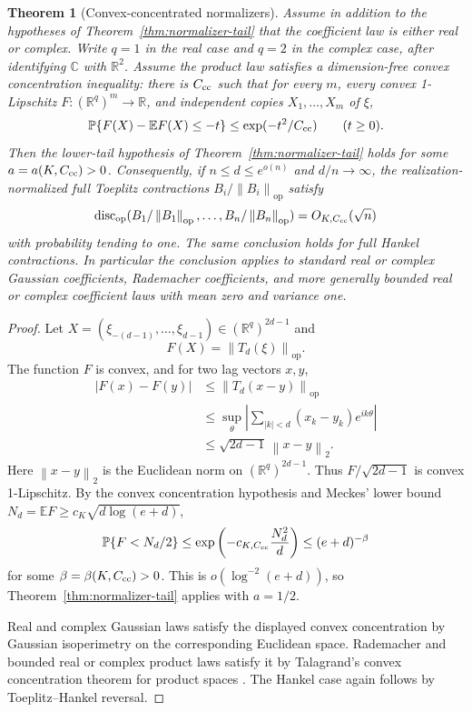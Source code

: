 \documentclass[11pt]{amsart}
\numberwithin{equation}{section}
\newtheorem{theorem}{Theorem}[section]
\theoremstyle{definition}
\theoremstyle{remark}
\newcommand{\C}{\mathbb C}
\newcommand{\R}{\mathbb R}
\newcommand{\op}{\mathrm{op}}
\newcommand{\discop}{\operatorname{disc}_{\op}}
\newcommand{\Prob}{\mathbb P}
\newcommand{\Exp}{\mathbb E}
\newcommand{\norm}[1]{\left\lVert #1\right\rVert}
\newcommand{\abs}[1]{\left\lvert #1\right\rvert}
\begin{document}
\begin{theorem}[Convex-concentrated normalizers]
\label{thm:convex-normalizers}
Assume in addition to the hypotheses of Theorem~\ref{thm:normalizer-tail} that
the coefficient law is either real or complex.  Write \(q=1\) in the real case
and \(q=2\) in the complex case, after identifying \(\C\) with \(\R^2\).
Assume the product law satisfies a dimension-free convex concentration
inequality: there is \(C_{\rm cc}\) such that for every \(m\), every convex
1-Lipschitz \(F:(\R^q)^m\to\R\), and independent copies
\(X_1,\ldots,X_m\) of \(\xi\),
\[
  \Prob\{F(X)-\Exp F(X)\le -t\}\le \exp(-t^2/C_{\rm cc})
  \qquad (t\ge0).
\]
Then the lower-tail hypothesis of Theorem~\ref{thm:normalizer-tail} holds for
some \(a=a(K,C_{\rm cc})>0\).  Consequently, if
\(n\le d\le e^{o(n)}\) and \(d/n\to\infty\), the realization-normalized full
Toeplitz contractions \(B_i/\norm{B_i}_{\op}\) satisfy
\[
  \discop(B_1/\norm{B_1}_{\op},\ldots,B_n/\norm{B_n}_{\op})
  =O_{K,C_{\rm cc}}(\sqrt n)
\]
with probability tending to one.  The same conclusion holds for full Hankel
contractions.  In particular the conclusion applies to standard real or complex
Gaussian coefficients, Rademacher coefficients, and more generally bounded real
or complex coefficient laws with mean zero and variance one.
\end{theorem}

\begin{proof}
Let \(X=(\xi_{-(d-1)},\ldots,\xi_{d-1})\in(\R^q)^{2d-1}\) and
\[
  F(X)=\norm{T_d(\xi)}_{\op}.
\]
The function \(F\) is convex, and for two lag vectors \(x,y\),
\begin{align*}
  \abs{F(x)-F(y)}
  &\le \norm{T_d(x-y)}_{\op} \\
  &\le \sup_\theta\abs{\sum_{\abs k<d}(x_k-y_k)e^{ik\theta}} \\
  &\le \sqrt{2d-1}\,\norm{x-y}_2 .
\end{align*}
Here \(\norm{x-y}_2\) is the Euclidean norm on \((\R^q)^{2d-1}\).  Thus
\(F/\sqrt{2d-1}\) is convex 1-Lipschitz.  By the convex concentration
hypothesis and Meckes' lower bound \(N_d=\Exp F\ge c_K\sqrt{d\log(e+d)}\),
\[
  \Prob\{F<N_d/2\}
  \le \exp\left(-c_{K,C_{\rm cc}}\frac{N_d^2}{d}\right)
  \le (e+d)^{-\beta}
\]
for some \(\beta=\beta(K,C_{\rm cc})>0\).  This is
\(o(\log^{-2}(e+d))\), so Theorem~\ref{thm:normalizer-tail} applies with
\(a=1/2\).

Real and complex Gaussian laws satisfy the displayed convex concentration by
Gaussian isoperimetry on the corresponding Euclidean space.  Rademacher and
bounded real or complex product laws satisfy it by Talagrand's convex
concentration theorem for product spaces \cite{Talagrand}.  The Hankel case
again follows by Toeplitz--Hankel reversal.
\end{proof}
\end{document}

